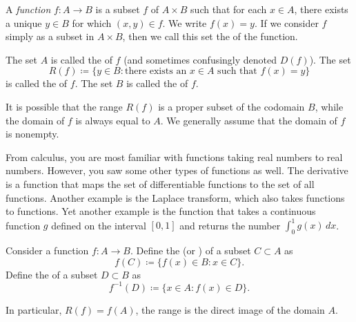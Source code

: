 \begin{defn}
A \emph{function} $f \colon A \to B$ is a subset $f$ of $A \times B$
such that for each $x \in A$, there exists a unique $y \in B$ for which $(x,y) \in f$.
We write $f(x) = y$.
If we consider $f$ simply as a subset in $A \times B$,
then we call this set the
\emph{} of the function.

The set $A$ is called the \emph{} of $f$ (and
sometimes confusingly denoted $D(f)$).  The set
\begin{equation*}
R(f) \coloneqq \{ y \in B : \text{there exists an } x \in A \text{ such that }
f(x)=y \}
\end{equation*}
is called the \emph{} of $f$.
The set $B$ is called the \emph{} of $f$.
\end{defn}

It is possible that the range $R(f)$ is a proper subset of the codomain $B$,
while the domain of $f$ is always equal to $A$.  We generally 
assume that the domain of $f$ is nonempty.

\begin{example}
From calculus, you are most familiar with functions taking real numbers to real
numbers.  However, you saw some other types of functions as well.
The derivative is a function that maps the set of
differentiable functions to the set of all functions.
Another example is the Laplace transform, which also
takes functions to functions.  Yet another example is the function that takes
a continuous function $g$ defined on the interval $[0,1]$ and returns the
number $\int_0^1 g(x) \,dx$.
\end{example}

\begin{defn}
Consider a function $f \colon A \to B$.  Define
the \emph{} (or \emph{}) of a subset
$C \subset A$ as
\begin{equation*}
f(C) \coloneqq \bigl\{ f(x) \in B : x \in C \bigr\} .
\end{equation*}
Define the \emph{} of a subset $D
\subset B$ as
\begin{equation*}
f^{-1}(D) \coloneqq \bigl\{ x \in A : f(x) \in D \bigr\} .
\end{equation*}
\end{defn}

In particular, $R(f) = f(A)$, the range is the direct image of
the domain $A$.

